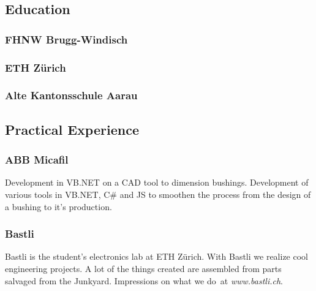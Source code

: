 \documentclass[]{resume}
\begin{document}
\begin{timeline}


\subsection{Education}

\subsubsection{FHNW Brugg-Windisch}
\sectionsep

\subsubsection{ETH Zürich}
\sectionsep

\subsubsection{Alte Kantonsschule Aarau}
\sectionsep


\subsection{Practical Experience}

\subsubsection{ABB Micafil}
Development in VB.NET on a CAD tool to dimension bushings.
Development of various tools in VB.NET, C\# and JS to smoothen the process from the design of a bushing to it's production.
\sectionsep

\subsubsection{Bastli}
Bastli is the student's electronics lab at ETH Zürich.
With Bastli we realize cool engineering projects. A lot of the things created are assembled from parts salvaged from the Junkyard.
Impressions on what we do at \textit{www.bastli.ch}.
\sectionsep


\end{timeline}
\end{document}

